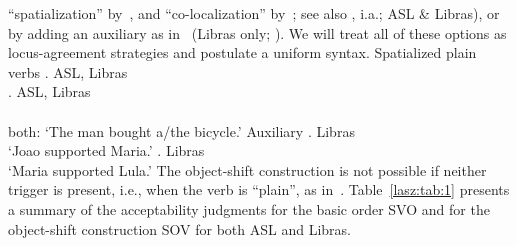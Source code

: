 \documentclass[output=paper]{langscibook}
\begin{document}
``spatialization'' by~\citealp{Quadros.etal.2004}, 
and ``co-localization'' by~\citealp{Lourenco.Wilbur.2018}; 
see also \citealp{Bergman.1980,Liddell.1980,Costello.2015,Smith.1990}, i.a.; ASL \& Libras),
or by adding an auxiliary as in~ (Libras only; \citealp{Quadros.1999}). We
will treat all of these options as locus-agreement strategies and
postulate a uniform syntax.
\ea 
    \label{lasz:ex:5}
    Spatialized plain verbs
    \ea 
          . 
        \hfill 
        \cmark ASL, \cmark Libras \\ 
        \citep[from][9]{Quadros.etal.2004}
    \ex 
          . 
        \hfill 
        \cmark ASL, \cmark Libras \\ 
        \citep[from][9]{Quadros.etal.2004} \\ 
        both: `The man bought a/the bicycle.'
    \z 
\ex 
    \label{lasz:ex:6}
    Auxiliary 
    \ea 
             . 
        \hfill 
        \cmark Libras 
        \\ 
        `Joao supported Maria.'
        \citep[from][7]{Quadros.etal.2004} 
    \ex 
            . 
        \hfill 
        \cmark Libras 
        \\ 
        `Maria supported Lula.' 
        \citep[from][5]{Quadros.etal.2004}
    \z 
\z 
The object-shift construction is not possible if neither trigger is
present, i.e., when the verb is ``plain'', as in~.
\ea 
    \label{lasz:ex:7}
    \z 
\z 
Table~\ref{lasz:tab:1} presents a summary of the acceptability judgments for the
basic order SVO and for the object-shift construction SOV for both
ASL and Libras.
\end{document}
